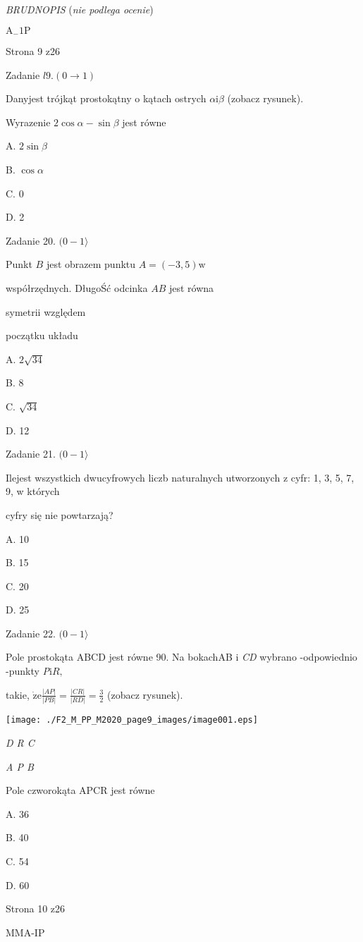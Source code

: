 \documentclass[a4paper,12pt]{article}
\begin{document}
{\it BRUDNOPIS} ({\it nie podlega ocenie})

$\mathrm{A}_{-}1\mathrm{P}$

Strona 9 z26





Zadanie $l9. (0\rightarrow 1)$

Danyjest trójkąt prostokątny o kątach ostrych $\alpha \mathrm{i}\beta$ (zobacz rysunek).

Wyrazenie $ 2\cos\alpha-\sin\beta$ jest równe

A. $ 2\sin\beta$

B. $\cos\alpha$

C. 0

D. 2

Zadanie 20. $(0-1\rangle$

Punkt $B$ jest obrazem punktu $A=(-3,5) \mathrm{w}$

współrzędnych. DługoŚć odcinka $AB$ jest równa

symetrii względem

początku układu

A. $2\sqrt{34}$

B. 8

C. $\sqrt{34}$

D. 12

Zadanie 21. $(0-1\rangle$

Ilejest wszystkich dwucyfrowych liczb naturalnych utworzonych z cyfr: 1, 3, 5, 7, 9, w których

cyfry się nie powtarzają?

A. 10

B. 15

C. 20

D. 25

Zadanie 22. $(0-1\rangle$

Pole prostokąta ABCD jest równe 90. Na bokachAB $\mathrm{i}$ {\it CD} wybrano -odpowiednio -punkty {\it P}$\mathrm{i}R,$

takie, $\displaystyle \dot{\mathrm{z}}\mathrm{e}\frac{|AP|}{|PB|}=\frac{|CR|}{|RD|}=\frac{3}{2}$ (zobacz rysunek).
\begin{center}
\texttt{[image: ./F2\_M\_PP\_M2020\_page9\_images/image001.eps]}
\end{center}
{\it D R  C}

{\it A  P B}

Pole czworokąta APCR jest równe

A. 36

B. 40

C. 54

D. 60

Strona 10 z26

MMA-IP
\end{document}
